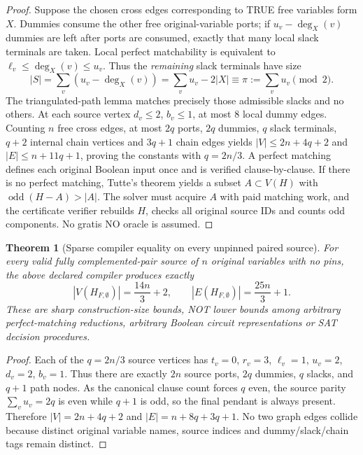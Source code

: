 \documentclass[11pt]{article}
\newtheorem{theorem}{Theorem}
\begin{document}
\begin{proof}
Suppose the chosen cross edges corresponding to TRUE free variables form $X$. Dummies consume the other free original-variable ports; if $u_v-\deg_X(v)$ dummies are left after ports are consumed, exactly that many local slack terminals are taken. Local perfect matchability is equivalent to $\ell_v\le\deg_X(v)\le u_v$. Thus the \emph{remaining} slack terminals have size
\[
|S|=\sum_v\left(u_v-\deg_X(v)\right)=\sum_v u_v-2|X|
 \equiv\pi:=\sum_v u_v\pmod2.
\]
The triangulated-path lemma matches precisely those admissible slacks and no others. At each source vertex $d_v\le2$, $b_v\le1$, at most $8$ local dummy edges. Counting $n$ free cross edges, at most $2q$ ports, $2q$ dummies, $q$ slack terminals, $q+2$ internal chain vertices and $3q+1$ chain edges yields $|V|\le2n+4q+2$ and $|E|\le n+11q+1$, proving the constants with $q=2n/3$. A perfect matching defines each original Boolean input once and is verified clause-by-clause. If there is no perfect matching, Tutte's theorem yields a subset $A\subset V(H)$ with $\operatorname{odd}(H-A)>|A|$. The solver must acquire $A$ with paid matching work, and the certificate verifier rebuilds $H$, checks all original source IDs and counts odd components. No gratis NO oracle is assumed.
\end{proof}

\begin{theorem}[Sparse compiler equality on every unpinned paired source]
For \emph{every} valid fully complemented-pair source of $n$ original variables with no pins, the above \emph{declared compiler} produces exactly
\[
 |V(H_{F,\emptyset})|=\frac{14n}{3}+2,\qquad
 |E(H_{F,\emptyset})|=\frac{25n}{3}+1.
\]
These are \emph{sharp construction-size bounds}, NOT lower bounds among arbitrary perfect-matching reductions, arbitrary Boolean circuit representations or SAT decision procedures.
\end{theorem}
\begin{proof}
Each of the $q=2n/3$ source vertices has $t_v=0$, $r_v=3$, $\ell_v=1$, $u_v=2$, $d_v=2$, $b_v=1$. Thus there are exactly $2n$ source ports, $2q$ dummies, $q$ slacks, and $q+1$ path nodes. As the canonical clause count forces $q$ even, the source parity $\sum_vu_v=2q$ is even while $q+1$ is odd, so the final pendant is always present. Therefore $|V|=2n+4q+2$ and $|E|=n+8q+3q+1$. No two graph edges collide because distinct original variable names, source indices and dummy/slack/chain tags remain distinct. \end{proof}
\end{document}
